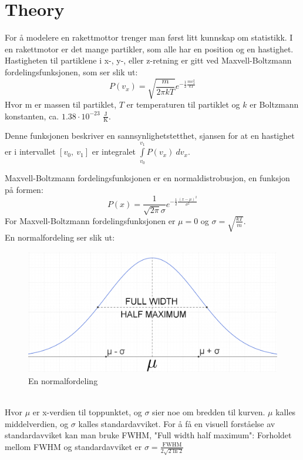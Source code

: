 \documentclass[reprint,english,notitlepage]{revtex4-1}
\begin{document}
\section{Theory}
	For å modelere en rakettmottor trenger man først litt kunnskap om statistikk.
	I en rakettmotor er det mange partikler, som alle har en position og en hastighet.
	Hastigheten til partiklene i x-, y-, eller z-retning er gitt ved Maxvell-Boltzmann
	fordelingsfunksjonen, som ser slik ut:
	$$
		P(v_x) = \sqrt{\frac{m}{2\pi k T}}e^{-\frac{1}{2}\frac{mv_x^2}{kT}}
	$$
	Hvor m er massen til partiklet, $T$ er temperaturen til partiklet og $k$ er
	Boltzmann konstanten, ca. $1.38 \cdot 10^{-23}$ $\frac{\text{J}}{\text{K}}$. \

	Denne funksjonen beskriver en sannsynlighetstetthet, sjansen for at en hastighet
	er i intervallet $[v_0,\ v_1]$ er integralet $\int\limits_{v_0}^{v_1} P(v_x)\ dv_x$. \

	Maxvell-Boltzmann fordelingsfunksjonen er en normaldistrobusjon, en funksjon på formen:
	$$
		P(x) = \frac{1}{\sqrt{2\pi}\sigma}e^{-\frac{1}{2}\frac{(x - \mu)^2}{\sigma^2}}
	$$
	For Maxvell-Boltzmann fordelingsfunksjonen er $\mu = 0$ og $\sigma = \sqrt{\frac{kT}{m}}$. \\
	En normalfordeling ser slik ut:
	\begin{figure}[h]
		\centering
		\caption{En normalfordeling}
		\includegraphics[scale=0.7]{../normal_distribution}
	\end{figure} \\
	Hvor $\mu$ er x-verdien til toppunktet, og $\sigma$ sier noe om bredden til kurven.
	$\mu$ kalles middelverdien, og $\sigma$ kalles standardavviket. For å få en
	visuell forståelse av standardavviket kan man bruke FWHM, "Full width half maximum":
	Forholdet mellom FWHM og standardavviket er $\sigma = \frac{\text{FWHM}}{2\sqrt{2\ln{2}}}$

	\vspace{0.5cm}
\end{document}
